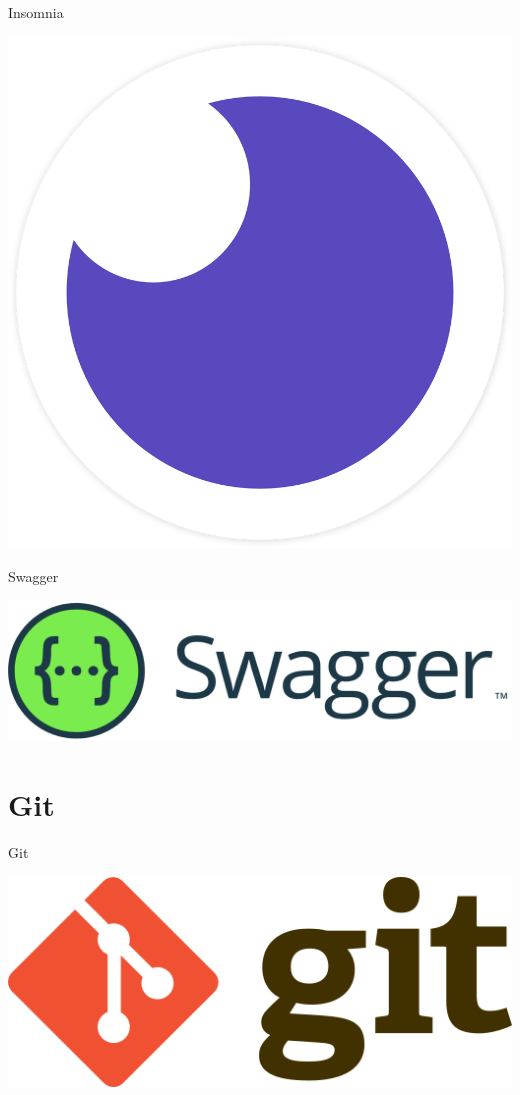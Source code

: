 \documentclass{beamer}
\begin{document}
\begin{frame}{Insomnia}
\begin{center}
  \includegraphics[scale=0.1]{images/insomnia-logo.png}
\end{center}
\end{frame}

\begin{frame}{Swagger}
\begin{center}
  \includegraphics[scale=0.18]{images/swagger.png}
\end{center}
\end{frame}

\section{Git}

\begin{frame}{Git}
\begin{center}
  \includegraphics[scale=0.25]{images/git-logo.png}
\end{center}
\end{frame}
\end{document}
